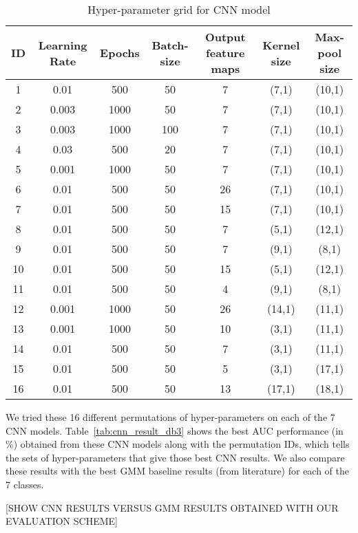 \begin{table}[tb]
\caption[Hyper-parameter grid for CNN model]{Hyper-parameter grid for CNN model}
\label{tab:hyper_param_grid_cnn_db3}
\centering
\begin{tabular}{ccccccc}
\toprule
ID & Learning Rate & Epochs & Batch-size & Output feature maps & Kernel size & Max-pool size \\
\midrule
1	& 0.01 & 500 & 50 & 7 & (7,1) & (10,1)\\
2	& 0.003 & 1000 & 50 & 7 & (7,1) & (10,1)\\
3   & 0.003 & 1000 & 100 & 7 & (7,1) & (10,1)\\
4 	& 0.03 & 500 & 20 & 7 & (7,1) &  (10,1)\\
5   & 0.001 & 1000 & 50 & 7 & (7,1) & (10,1)\\
6   & 0.01 & 500 & 50 & 26 & (7,1) &  (10,1)\\
7   & 0.01 & 500 & 50 & 15 & (7,1) &  (10,1)\\
8   & 0.01 & 500 & 50 & 7 & (5,1) &  (12,1)\\
9   & 0.01 & 500 & 50 & 7 & (9,1) & (8,1)\\
10   & 0.01 & 500 & 50 & 15 & (5,1) & (12,1)\\
11   & 0.01 & 500 & 50 & 4 & (9,1) & (8,1)\\
12   & 0.001 & 1000 & 50 & 26 & (14,1) & (11,1)\\
13   & 0.001 & 1000 & 50 & 10 & (3,1) & (11,1)\\
14   & 0.01 & 500 & 50 & 7 & (3,1) &  (11,1)\\
15   & 0.01 & 500 & 50 & 5 & (3,1) & (17,1)\\
16   & 0.01 & 500 & 50 & 13 & (17,1) & (18,1)\\
\bottomrule 
\end{tabular}
\end{table}

We tried these 16 different permutations of hyper-parameters on each of the 7 CNN models. Table~\ref{tab:cnn_result_db3} shows the best AUC performance (in \%) obtained from these CNN models along with the permutation IDs, which tells the sets of hyper-parameters that give those best CNN results. We also compare these results with the best GMM baseline results (from literature) for each of the 7 classes.

[SHOW CNN RESULTS VERSUS GMM RESULTS OBTAINED WITH OUR EVALUATION SCHEME]

